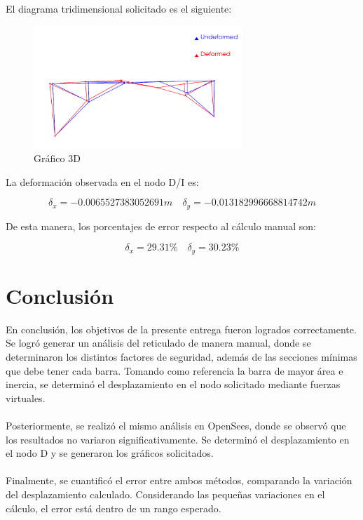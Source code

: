 El diagrama tridimensional solicitado es el siguiente:

\begin{figure}[H]
    \centering
    \includegraphics[width=0.7\textwidth]{GRAFICOS/3D.png}
    \caption{Gráfico 3D}
    \label{fig:deformaciones_3D}
\end{figure}

La deformación observada en el nodo D/I es:

\begin{equation}
    \delta_x = -0.0065527383052691 m \quad \delta_y = -0.013182996668814742 m
\end{equation}

De esta manera, los porcentajes de error respecto al cálculo manual son:

\begin{equation}
    \delta_x = 29.31\% \quad \delta_y = 30.23\%
\end{equation}

\section{Conclusión}

En conclusión, los objetivos de la presente entrega fueron logrados correctamente. Se logró generar un análisis del reticulado de manera manual, donde se determinaron los distintos factores de seguridad, además de las secciones mínimas que debe tener cada barra. Tomando como referencia la barra de mayor área e inercia, se determinó el desplazamiento en el nodo solicitado mediante fuerzas virtuales.
\\ \\
Posteriormente, se realizó el mismo análisis en OpenSees, donde se observó que los resultados no variaron significativamente. Se determinó el desplazamiento en el nodo D y se generaron los gráficos solicitados.
\\ \\
Finalmente, se cuantificó el error entre ambos métodos, comparando la variación del desplazamiento calculado. Considerando las pequeñas variaciones en el cálculo, el error está dentro de un rango esperado.


